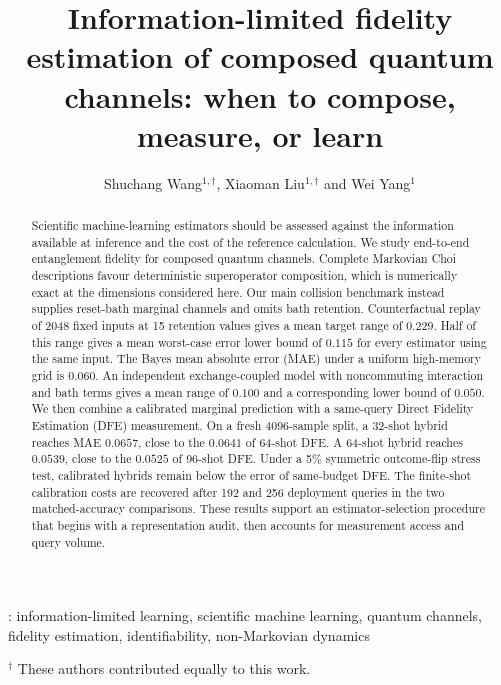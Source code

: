 \documentclass[12pt]{iopart}
\begin{document}
\title[Information-limited fidelity estimation]{Information-limited fidelity estimation of composed quantum channels: when to compose, measure, or learn}

\author{Shuchang Wang$^{1,\dagger}$, Xiaoman Liu$^{1,\dagger}$ and Wei Yang$^{1}$}

\address{$^{1}$ School of Computer Science and Technology, University of Science and Technology of China, Hefei 230026, China}


\begin{abstract}
Scientific machine-learning estimators should be assessed against the information available at inference and the cost of the reference calculation. We study end-to-end entanglement fidelity for composed quantum channels. Complete Markovian Choi descriptions favour deterministic superoperator composition, which is numerically exact at the dimensions considered here. Our main collision benchmark instead supplies reset-bath marginal channels and omits bath retention. Counterfactual replay of 2048 fixed inputs at 15 retention values gives a mean target range of $0.229$. Half of this range gives a mean worst-case error lower bound of $0.115$ for every estimator using the same input. The Bayes mean absolute error (MAE) under a uniform high-memory grid is $0.060$. An independent exchange-coupled model with noncommuting interaction and bath terms gives a mean range of $0.100$ and a corresponding lower bound of $0.050$. We then combine a calibrated marginal prediction with a same-query Direct Fidelity Estimation (DFE) measurement. On a fresh 4096-sample split, a 32-shot hybrid reaches MAE $0.0657$, close to the $0.0641$ of 64-shot DFE. A 64-shot hybrid reaches $0.0539$, close to the $0.0525$ of 96-shot DFE. Under a 5\% symmetric outcome-flip stress test, calibrated hybrids remain below the error of same-budget DFE. The finite-shot calibration costs are recovered after 192 and 256 deployment queries in the two matched-accuracy comparisons. These results support an estimator-selection procedure that begins with a representation audit, then accounts for measurement access and query volume.
\end{abstract}

\vspace{1pc}
: information-limited learning, scientific machine learning, quantum channels, fidelity estimation, identifiability, non-Markovian dynamics

\vspace{1pc}
\noindent$^{\dagger}$ These authors contributed equally to this work.
\end{document}
